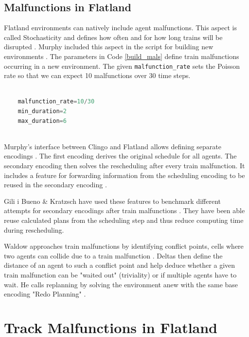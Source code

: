 \documentclass[runningheads]{llncs}
\begin{document}
\subsection{Malfunctions in Flatland}
\label{flatland_mals}
Flatland environments can natively include agent malfunctions. This aspect is called Stochasticity and defines how often and for how long trains will be disrupted \cite{Flatland2023}. Murphy included this aspect in the script for building new environments \cite{Murphy2026a}. The parameters in Code \ref{build_mals} define train malfunctions occurring in a new environment. The given \verb|malfunction_rate| sets the Poisson rate so that we can expect 10 malfunctions over 30 time steps.

\begin{lstlisting}[style=mystyle, language=Python, caption={Generate train malfunctions in build.py.}, label={build_mals}]
	
	malfunction_rate=10/30
	min_duration=2
	max_duration=6
	
\end{lstlisting}

Murphy's interface between Clingo and Flatland allows defining separate encodings \cite{Murphy2026a}. The first encoding derives the original schedule for all agents. The secondary encoding then solves the rescheduling after every train malfunction. It includes a feature for forwarding information from the scheduling encoding to be reused in the secondary encoding \cite{Murphy2026a} \cite{gilkra2025}. 

Gili i Bueno \& Kratzsch have used these features to benchmark different attempts for secondary encodings after train malfunctions \cite{gilkra2025}. They have been able reuse calculated plans from the scheduling step and thus reduce computing time during rescheduling.

Waldow approaches train malfunctions by identifying conflict points, cells where two agents can collide due to a train malfunction \cite{waldow2025}. Deltas then define the distance of an agent to such a conflict point and help deduce whether a given train malfunction can be "waited out" (triviality) or if multiple agents have to wait. He calls replanning by solving the environment anew with the same base encoding "Redo Planning" \cite[p.~24]{waldow2025}.

\section{Track Malfunctions in Flatland}
\end{document}
